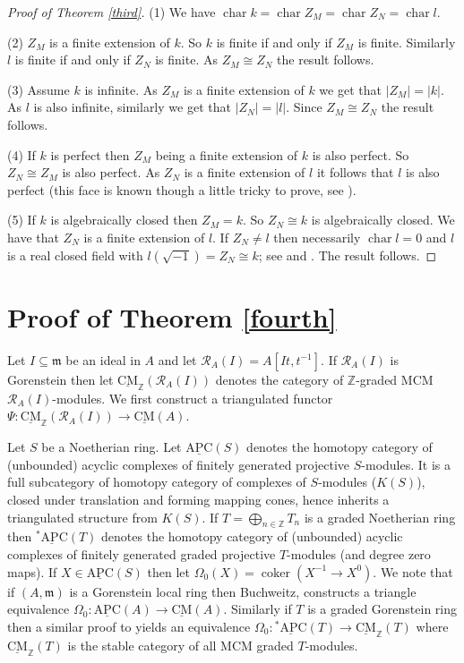 \documentclass{amsart}
\newcommand{\m}{\mathfrak{m} }
\newcommand{\Z}{\mathbb{Z} }
\newcommand{\eR}{\mathcal{R} }
\newcommand{\rt}{\rightarrow}
\newcommand{\charp}{\operatorname{char}}
\newcommand{\coker}{\operatorname{coker}}
\newcommand{\CMS}{\operatorname{\underline{CM}}}
\newcommand{\apc}{\operatorname{\underline{APC}}}
\newcommand{\gapc}{\operatorname{\underline{^*APC}}}
\theoremstyle{plain}
\theoremstyle{definition}
\theoremstyle{remark}
\begin{document}
{\begin{proof}[Proof of Theorem \ref{third}]
(1) We have $\charp k = \charp Z_M = \charp Z_N = \charp l$.

(2) $Z_M$ is a finite extension of $k$. So $k$ is finite if and only if $Z_M$ is finite. Similarly $l$ is finite if and only if $Z_N$ is finite. As $Z_M \cong Z_N$ the result follows.

(3) Assume $k$ is infinite. As $Z_M$ is a finite extension of $k$ we get that $|Z_M| = |k|$. As $l$ is also infinite, similarly we get that $|Z_N| = |l|$. Since $Z_M \cong Z_N$ the result follows.

(4) If $k$ is perfect then $Z_M$ being a finite extension of $k$ is also perfect. So $Z_N \cong Z_M$ is also perfect. As $Z_N$ is a finite extension of $l$ it follows that $l$ is also perfect
 (this face is known though a little tricky to prove, see \cite{WS}).

(5) If $k$ is algebraically closed then $Z_M = k$. So $Z_N \cong k$ is algebraically closed. We have that $Z_N$ is a finite extension of $l$. If $Z_N \neq l$ then necessarily $\charp l = 0$ and $l$ is a real closed field with $l(\sqrt{-1}) = Z_N \cong k$; see \cite[VI, 9.3]{L} and \cite[XI, 2.4]{L}. The result follows.
\end{proof}

\section{Proof of Theorem \ref{fourth}}
\s \label{set-4} Let $I \subseteq \m$ be an ideal in $A$ and let  $\eR_A(I) = A[It, t^{-1}]$.
If $\eR_A(I)$ is Gorenstein then let $\CMS_\Z(\eR_A(I))$ denotes the category of $\Z$-graded MCM $\eR_A(I)$-modules.
We first construct a triangulated functor $\Psi \colon \CMS_\Z(\eR_A(I)) \rt \CMS(A)$.

\s Let $S$ be a Noetherian ring. Let  $\apc(S)$ denotes the
homotopy category of (unbounded) acyclic complexes of finitely  generated projective
$S$-modules.
It is a full
subcategory of homotopy category of complexes of $S$-modules ($K(S)$), closed under translation and forming mapping cones, hence
inherits a triangulated structure from $K(S)$.  If $T = \bigoplus_{n \in \Z}T_n$ is a graded Noetherian ring then  $\gapc(T)$ denotes the
homotopy category of (unbounded) acyclic complexes of finitely  generated graded projective
$T$-modules (and degree zero maps).
If $X \in \apc(S)$ then let $\Omega_0(X) = \coker(X^{-1} \rt X^0)$. We note that if $(A,\m)$ is a Gorenstein local ring then Buchweitz, \cite[4.4.1]{Bu} constructs a triangle equivalence
$\Omega_0 \colon \apc(A) \rt \CMS(A)$. Similarly if $T$ is a graded Gorenstein ring  then a similar proof to  \cite[4.4.1]{Bu} yields an equivalence
$\Omega_0 \colon \gapc(T) \rt \CMS_\Z(T)$ where $\CMS_\Z(T)$ is the stable category of all MCM graded $T$-modules.

}
\end{document}
